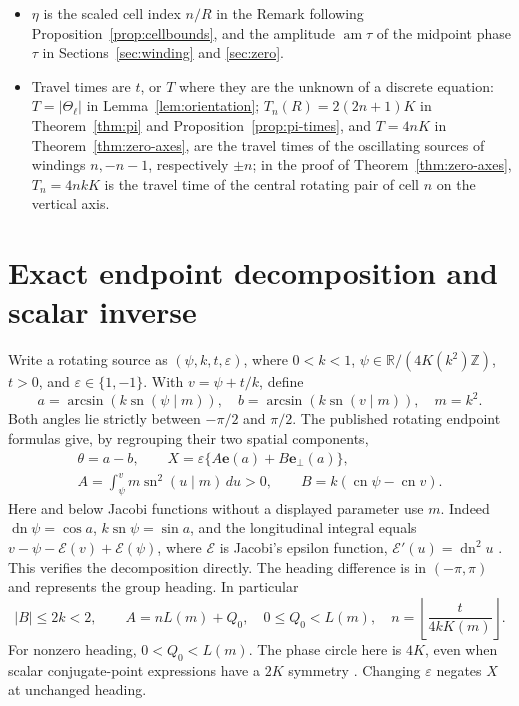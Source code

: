 \documentclass[11pt,a4paper]{article}
\theoremstyle{remark}\newtheorem{remark}[theorem]{Remark}
\newcommand{\sn}{\operatorname{sn}}
\newcommand{\cn}{\operatorname{cn}}
\newcommand{\dn}{\operatorname{dn}}
\newcommand{\ee}{\mathbf e}
\newcommand{\ep}{\mathbf e_{\perp}}
\begin{document}
\begin{itemize}[nosep,leftmargin=*]
\item $\eta$ is the scaled cell index $n/R$ in the Remark following
 Proposition~\ref{prop:cellbounds}, and the amplitude
 $\operatorname{am}\tau$ of the midpoint phase $\tau$ in
 Sections~\ref{sec:winding} and \ref{sec:zero}.
\item Travel times are $t$, or $T$ where they are the unknown of a
 discrete equation: $T=|\Theta_\ell|$ in Lemma~\ref{lem:orientation};
 $T_n(R)=2(2n+1)K$ in Theorem~\ref{thm:pi} and
 Proposition~\ref{prop:pi-times}, and $T=4nK$ in
 Theorem~\ref{thm:zero-axes}, are the travel times of the oscillating
 sources of windings $n,-n-1$, respectively $\pm n$; in the proof of
 Theorem~\ref{thm:zero-axes}, $T_n=4nkK$ is the travel time of the
 central rotating pair of cell $n$ on the vertical axis.
\end{itemize}

\section{Exact endpoint decomposition and scalar inverse}
\label{sec:decomposition}

Write a rotating source as $(\psi,k,t,\varepsilon)$, where $0<k<1$,
$\psi\in\mathbb R/(4K(k^2)\mathbb Z)$, $t>0$, and
$\varepsilon\in\{1,-1\}$. With $v=\psi+t/k$, define
\begin{equation}\label{eq:ab}
 a=\arcsin(k\sn(\psi\mid m)),\quad
 b=\arcsin(k\sn(v\mid m)),\quad m=k^2.
\end{equation}
Both angles lie strictly between $-\pi/2$ and $\pi/2$.
The published rotating endpoint formulas \cite[Section 3.3]{MS}
give, by regrouping their two spatial components,
\begin{equation}\label{eq:decomposition}
 \begin{gathered}
 \theta=a-b,\qquad X=\varepsilon\{A\ee(a)+B\ep(a)\},\\
 A=\int_\psi^v m\sn^2(u\mid m)\,du>0,\qquad
 B=k(\cn\psi-\cn v).
 \end{gathered}
\end{equation}
Here and below Jacobi functions without a displayed parameter use $m$.
Indeed $\dn\psi=\cos a$, $k\sn\psi=\sin a$, and the longitudinal
integral equals $v-\psi-\mathcal E(v)+\mathcal E(\psi)$, where
$\mathcal E$ is Jacobi's epsilon function, $\mathcal E'(u)=\dn^2u$
\cite[Section 22.16]{DLMF}. This verifies the decomposition directly.
The heading difference is in $(-\pi,\pi)$ and represents the group heading.
In particular
\begin{equation}\label{eq:bound}
 |B|\le2k<2,\qquad
 A=nL(m)+Q_0,\quad 0\le Q_0<L(m),\quad
 n=\left\lfloor\frac{t}{4kK(m)}\right\rfloor.
\end{equation}
For nonzero heading, $0<Q_0<L(m)$. The phase circle here is $4K$,
even when scalar conjugate-point expressions have a $2K$ symmetry
\cite{CT}.
Changing $\varepsilon$ negates $X$ at unchanged heading.
\end{document}
